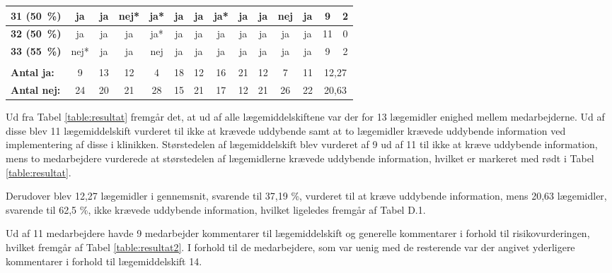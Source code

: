 \begin{longtable} {|l|c|c|c|c|c|c|c|c|c|c|c|c|c|}
\cellcolor[HTML]{C0C0C0}\textbf{31 (50~\%)}	&ja	&ja	&nej*&ja*	&ja	&ja	&ja*	&ja	&ja	&nej&	ja  & \cellcolor[HTML]{EFEFEF}9 & \cellcolor[HTML]{EFEFEF}2  \\ \hline
\cellcolor[HTML]{C0C0C0}\textbf{32 (50~\%)}	&\cellcolor[HTML]{ECF4FF}ja	&\cellcolor[HTML]{ECF4FF}ja	&\cellcolor[HTML]{ECF4FF}ja	&\cellcolor[HTML]{ECF4FF}ja*	&\cellcolor[HTML]{ECF4FF}ja	&\cellcolor[HTML]{ECF4FF}ja	&\cellcolor[HTML]{ECF4FF}ja	& \cellcolor[HTML]{ECF4FF}ja	&\cellcolor[HTML]{ECF4FF}ja	&\cellcolor[HTML]{ECF4FF}ja	&\cellcolor[HTML]{ECF4FF}ja  & \cellcolor[HTML]{EFEFEF}11 & \cellcolor[HTML]{EFEFEF}0\\ \hline
\cellcolor[HTML]{C0C0C0}\textbf{33 (55~\%)}	&nej*&	ja	&ja	&nej	&ja	&ja	&ja	&ja	&ja	&ja	&ja & \cellcolor[HTML]{EFEFEF}9 & \cellcolor[HTML]{EFEFEF}2\\ \hline
\rowcolor[HTML]{EFEFEF}\multicolumn{14}{|r|}{\textbf{Gennemsnit:}}\\
\rowcolor[HTML]{EFEFEF}\textbf{Antal ja:} & 9 & 13 &	12 &	 4 &\cellcolor[HTML]{F6E6E5}18&	12&	16&	\cellcolor[HTML]{F6E6E5}21&	12&	7&	11 & \multicolumn{2}{|c|}{12,27}\\ \hline
\rowcolor[HTML]{EFEFEF}\textbf{Antal nej:} &24 &	20&	21&	28&	\cellcolor[HTML]{F6E6E5}15&	21&	17&	\cellcolor[HTML]{F6E6E5}12&	21&	26&	22 &\multicolumn{2}{|c|}{20,63} \\ \hline
\end{longtable}

Ud fra Tabel \ref{table:resultat} fremgår det, at ud af alle lægemiddelskiftene var der for 13 lægemidler enighed mellem medarbejderne. Ud af disse blev 11 lægemiddelskift vurderet til ikke at krævede uddybende samt at to lægemidler krævede uddybende information ved
implementering af disse i klinikken. Størstedelen af lægemiddelskift blev vurderet af 9 ud af 11 til ikke at kræve uddybende information, mens to medarbejdere vurderede at størstedelen af lægemidlerne krævede uddybende information, hvilket er markeret med
rødt i Tabel \ref{table:resultat}.

Derudover blev 12,27 lægemidler i gennemsnit, svarende til 37,19 \%,
vurderet til at kræve uddybende information, mens 20,63 lægemidler, svarende til 62,5 \%,
ikke krævede uddybende information, hvilket ligeledes fremgår af Tabel D.1.

Ud af 11 medarbejdere havde 9 medarbejder kommentarer til lægemiddelskift og generelle kommentarer i forhold til risikovurderingen, hvilket fremgår af Tabel \ref{table:resultat2}. I forhold til de medarbejdere, som var uenig med de resterende var der angivet yderligere kommentarer i forhold til lægemiddelskift 14. 

